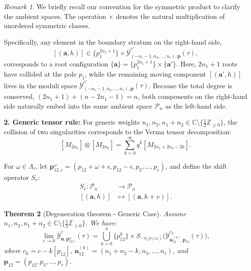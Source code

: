 \documentclass[11pt]{amsart}
\newtheorem{theorem}{Theorem}[section]
\theoremstyle{remark}
\newtheorem{remark}[theorem]{Remark}
\numberwithin{equation}{section}
\begin{document}
\begin{remark}
We briefly recall our convention for the symmetric product to clarify the ambient spaces. The operation $\times$ denotes the natural multiplication of unordered symmetric classes. 

Specifically, any element in the boundary stratum on the right-hand side,
\[
    [(\mathbf{a},h)] \in \{p_1^{2n_1+1}\} \times \overline{\mathcal{Y}}^{c'}_{(-n_1-1,n_2,\dots,n_r),\mathbf{p}} (\tau),
\]
corresponds to a root configuration $\{ \mathbf{a} \} = \{p_1^{2n_1+1}\} \times \{\mathbf{a}'\}$. Here, $2n_1+1$ roots have collided at the pole $p_1$, while the remaining moving component $[(\mathbf{a}', h)]$ lives in the moduli space $\overline{\mathcal{Y}}^{c'}_{(-n_1-1,n_2,\dots,n_r),\mathbf{p}} (\tau)$. Because the total degree is conserved, $(2n_1+1) + (n - 2n_1 - 1) = n$, both components on the right-hand side naturally embed into the same ambient space $\mathcal{P}_n$ as the left-hand side.
\end{remark}


\vspace{0.5em}
\noindent \textbf{2. Generic tensor rule:} For generic weights $n_1,n_2,n_1+n_2 \in \mathbb{C} \setminus \{ \tfrac{1}{2} \mathbb{Z}_{\geq 0} \}$, the collision of two singularities corresponds to the Verma tensor decomposition:
\[
    [M_{2n_1}] \otimes [M_{2n_2}] = \sum_{k=0}^\infty q^k [M_{2n_1+2n_2-2k}].
\]

For $\omega \in \Lambda_\tau$, let $\mathbf{p}_{12, \epsilon}^\omega = (p_{12} + \omega + \epsilon, p_{12} - \epsilon, p_3, \dots, p_r)$, and define the shift operator $S_v$:
\[
\begin{split}
     S_v : \mathcal{P}_n &\rightarrow \mathcal{P}_n \\
     [(\mathbf{a},h)] &\mapsto [(\mathbf{a},h+v)].
\end{split}
\]

\begin{theorem}[Degeneration theorem - Generic Case] \label{thm:dege_generic}
Assume $n_1, n_2, n_1+n_2 \in \mathbb{C} \setminus \{ \tfrac{1}{2} \mathbb{Z}_{\geq 0} \}$. We have:
\[
    \lim_{\epsilon \to 0} \overline{\mathcal{Y}}_{\mathbf{n}, \mathbf{p}_{12, \epsilon}^\omega}^c(\tau) =
    \bigcup_{k=0}^{n} \{p_{12}^k\} \times S_{-n_1 \eta(\omega)} \Big( \overline{\mathcal{Y}}^{c_k}_{\mathbf{n}_{12}^{(k)},\mathbf{p}_{12}}(\tau) \Big),
\]
where $c_k = c - k [p_{12}]$, $\mathbf{n}_{12}^{(k)} = (n_1+n_2-k,n_3,\dots,n_r)$, and $\mathbf{p}_{12} = (p_{12},p_3,\dots,p_r)$.
\end{theorem}
\end{document}
